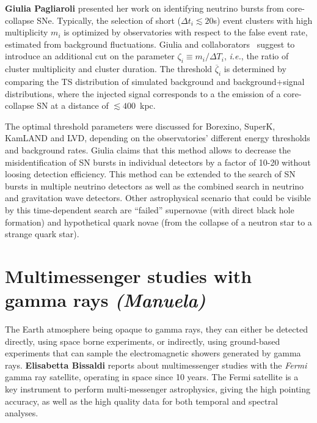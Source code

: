 \documentclass{PoS}
\begin{document}
{\bf Giulia Pagliaroli} presented her work on identifying neutrino bursts from core-collapse SNe. Typically, the selection of short ($\Delta t_i\lesssim 20$s) event clusters with high multiplicity $m_i$ is optimized by observatories with respect to the false event rate, estimated from background fluctuations. Giulia and collaborators~\cite{Casentini:2018bdf} suggest to introduce an additional cut on the parameter $\zeta_i \equiv m_i/\Delta T_i$, {\it i.e.}, the ratio of cluster multiplicity and cluster duration. The threshold $\overline{\zeta}_i$ is determined by comparing the TS distribution of simulated background and background+signal distributions, where the injected signal corresponds to a the emission of a core-collapse SN at a distance of $\lesssim400$~kpc. 

The optimal threshold parameters were discussed for Borexino, SuperK, KamLAND and LVD, depending on the observatories' different energy thresholds and background rates. Giulia claims that this method allows to decrease the misidentification of SN bursts in individual detectors by a factor of 10-20 without loosing detection efficiency. This method can be extended to the search of SN bursts in multiple neutrino detectors as well as the combined search in neutrino and gravitation wave detectors. Other astrophysical scenario that could be visible by this time-dependent search are ``failed'' supernovae (with direct black hole formation) and hypothetical quark novae (from the collapse of a neutron star to a strange quark star).


\section{Multimessenger studies with gamma rays {\it (Manuela)}}
The Earth atmosphere being opaque to gamma rays, they can either be  detected directly, using space borne experiments, or indirectly, using ground-based experiments that can sample the electromagnetic showers generated by gamma rays. %
{\bf Elisabetta Bissaldi} reports about multimessenger studies with the \textit{Fermi} gamma ray satellite, operating in space since 10 years. The Fermi satellite is a key instrument to perform multi-messenger astrophysics, giving the high pointing accuracy, as well as the high quality data for both temporal and spectral analyses. 
\end{document}
